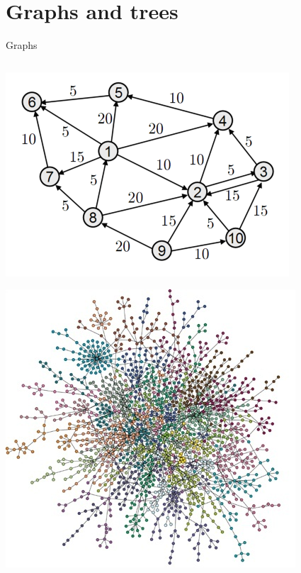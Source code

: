 \part{Graphs and trees}
\frame{\partpage}

\begin{frame}{Graphs}
	\begin{columns}
		\pause
		\begin{column}{0.3\textwidth}
			\includegraphics[width=\textwidth]{graph1}
			\par
			\vspace{2ex}
			\includegraphics[width=\textwidth]{graph2}

\end{column}
\end{columns}
\end{frame}
